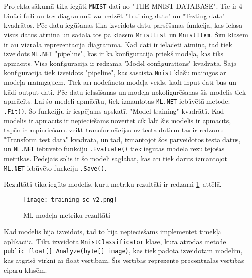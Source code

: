     Projekta sākumā tika iegūti \texttt{MNIST} dati no "THE MNIST DATABASE". Tie ir 4 bināri faili
    un tos diagrammā var redzēt "Training data" un "Testing data" kvadrātos. Pēc datu iegūšanas tika
    izveidots datu parsēšanas funkcija, kas ielasa visus datus atmiņā un sadala tos pa klasēm
    \texttt{MnistList} un \texttt{MnistItem}. Šīm klasēm ir arī vizuāla reprezentācija diagrammā.
    Kad dati ir ielādēti atmiņā, tad tiek izveidots \texttt{ML.NET} "pipeline", kas ir kā konfigurācija
    priekš modeļa, kas tiks apmācīts. Visa konfigurācija ir redzama "Model configurations" kvadrātā. Šajā konfigurācijā
    tiek izveidots "pipeline", kas sasaista \texttt{Mnist} klašu mainīgos ar modeļa mainīgajiem.
    Tiek arī nodefinēta modeļa veids, kādi input dati būs un kādi output dati. Pēc datu ielasīšanas
    un modeļa nokofigurēšanas šis modelis tiek apmācīts. Lai šo modeli apmācītu, tiek izmantotas
    \texttt{ML.NET} iebūvētā metode: \texttt{.Fit()}. Šo funkcijju ir iespējams apskatīt "Model training"
    kvadrātā. Kad modelis ir apmācīts ir nepieciešams novērtēt cik labi šis modelis ir apmācīts, tapēc
    ir nepieciešams veikt transformācijas uz testa datiem tas ir redzams "Transform test data" kvadrātā,
    un tad, izmantojot šos pārveidotos testa datus, un \texttt{ML.NET} iebūvēto funkciju \texttt{.Evaluate()}
    tiek iegūtas modeļa rezultējošās metrikas. Pēdējais solis ir šo modeli saglabāt, kas arī tiek darīts
    izmantojot \texttt{ML.NET} iebūvēto funkciju \texttt{.Save()}.

    Rezultātā tika iegūts modelis, kuru metriku rezultāti ir redzami \ref{ml:metrics}~attēlā.

    \begin{figure}[H]
        \centering
        \texttt{[image: training-sc-v2.png]}
        \caption{ML modeļa metriku rezultāti}
        \label{ml:metrics}
    \end{figure}

    Kad modelis bija izveidots, tad to bija nepieciešams implementēt tīmekļa aplikācijā. Tika izveidota
    \texttt{MnistClassificator} klase, kurā atrodas  metode \texttt{public float[] Analyze(byte[] image)}, kas tiek padota izveidotam modelim, kas atgriež
    virkni ar float vērtībām. Šīs vērtības reprezentē procentuālās vērtības ciparu klasēm.

